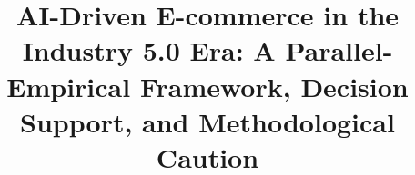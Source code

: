 \documentclass[authoryear,review,3p,times,12pt]{elsarticle}
\begin{document}
\begin{frontmatter}



\title{AI-Driven E-commerce in the Industry 5.0 Era: A Parallel-Empirical Framework, Decision Support, and Methodological Caution}









\end{frontmatter}
\end{document}
